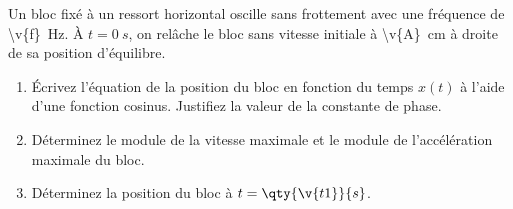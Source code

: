 Un bloc fixé à un ressort horizontal oscille sans frottement avec une fréquence de \qty{\v{f}}{Hz}. À $t = \qty{0}{s}$, on relâche le bloc sans vitesse initiale à \qty{\v{A}}{cm} à droite de sa position d'équilibre.

\begin{enumerate}[label=\alph*)]
    \item Écrivez l'équation de la position du bloc en fonction du temps $x(t)$ à l'aide d'une fonction cosinus. Justifiez la valeur de la constante de phase.
    \item Déterminez le module de la vitesse maximale et le module de l'accélération maximale du bloc.
    \item Déterminez la position du bloc à $t = \qty{\v{t1}}{s}$.
\end{enumerate}
